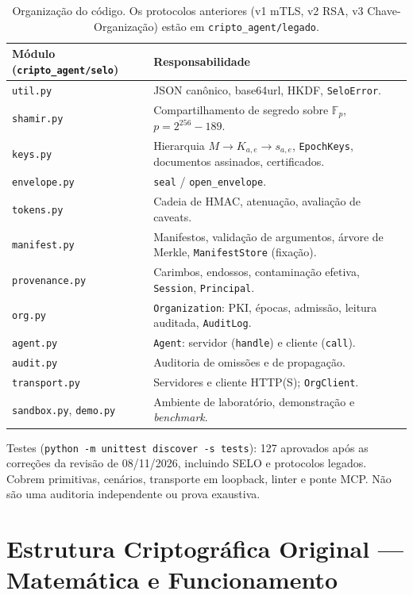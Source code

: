 \documentclass[11pt,a4paper]{article}
\theoremstyle{plain}
\theoremstyle{definition}
\theoremstyle{remark}
\newcommand{\cod}[1]{\texttt{#1}}
\begin{document}
\begin{table}[h!]
\centering\small
\begin{tabular}{p{3.3cm}p{11.7cm}}
\toprule
\rowcolor{corCaixa}\textbf{Módulo (\cod{cripto\_agent/selo})} & \textbf{Responsabilidade} \\
\midrule
\cod{util.py} & JSON canônico, base64url, HKDF, \cod{SeloError}. \\
\cod{shamir.py} & Compartilhamento de segredo sobre $\mathbb{F}_p$, $p=2^{256}-189$. \\
\cod{keys.py} & Hierarquia $M\to K_{a,e}\to s_{a,e}$, \cod{EpochKeys}, documentos assinados, certificados. \\
\cod{envelope.py} & \cod{seal} / \cod{open\_envelope}. \\
\cod{tokens.py} & Cadeia de HMAC, atenuação, avaliação de caveats. \\
\cod{manifest.py} & Manifestos, validação de argumentos, árvore de Merkle, \cod{ManifestStore} (fixação). \\
\cod{provenance.py} & Carimbos, endossos, contaminação efetiva, \cod{Session}, \cod{Principal}. \\
\cod{org.py} & \cod{Organization}: PKI, épocas, admissão, leitura auditada, \cod{AuditLog}. \\
\cod{agent.py} & \cod{Agent}: servidor (\cod{handle}) e cliente (\cod{call}). \\
\cod{audit.py} & Auditoria de omissões e de propagação. \\
\cod{transport.py} & Servidores e cliente HTTP(S); \cod{OrgClient}. \\
\cod{sandbox.py}, \cod{demo.py} & Ambiente de laboratório, demonstração e \emph{benchmark}. \\
\bottomrule
\end{tabular}
\caption{Organização do código. Os protocolos anteriores (v1 mTLS, v2 RSA, v3 Chave-Organização) estão em \cod{cripto\_agent/legado}.}
\end{table}

Testes (\cod{python -m unittest discover -s tests}): 127 aprovados após as correções da revisão de 08/11/2026, incluindo SELO e protocolos legados. Cobrem primitivas, cenários, transporte em loopback, linter e ponte MCP. Não são uma auditoria independente ou prova exaustiva.

\section{Estrutura Criptográfica Original --- Matemática e Funcionamento}
\end{document}

